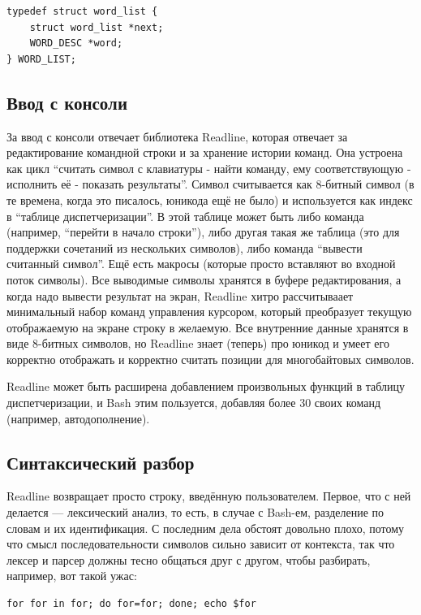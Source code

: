 \documentclass[a5paper]{article}
\begin{document}
\begin{verbatim}
typedef struct word_list {
    struct word_list *next;
    WORD_DESC *word;
} WORD_LIST;
\end{verbatim}

\subsection{Ввод с консоли}

За ввод с консоли отвечает библиотека Readline, которая отвечает за редактирование командной строки и за хранение истории команд. Она устроена как цикл ``считать символ с клавиатуры - найти команду, ему соответствующую - исполнить её - показать результаты''. Символ считывается как 8-битный символ (в те времена, когда это писалось, юникода ещё не было) и используется как индекс в ``таблице диспетчеризации''. В этой таблице может быть либо команда (например, ``перейти в начало строки''), либо другая такая же таблица (это для поддержки сочетаний из нескольких символов), либо команда ``вывести считанный символ''. Ещё есть макросы (которые просто вставляют во входной поток символы). Все выводимые символы хранятся в буфере редактирования, а когда надо вывести результат на экран, Readline хитро рассчитываает минимальный набор команд управления курсором, который преобразует текущую отображаемую на экране строку в желаемую. Все внутренние данные хранятся в виде 8-битных символов, но Readline знает (теперь) про юникод и умеет его корректно отображать и корректно считать позиции для многобайтовых символов.

Readline может быть расширена добавлением произвольных функций в таблицу диспетчеризации, и Bash этим пользуется, добавляя более 30 своих команд (например, автодополнение).

\subsection{Синтаксический разбор}

Readline возвращает просто строку, введённую пользователем. Первое, что с ней делается --- лексический анализ, то есть, в случае с Bash-ем, разделение по словам и их идентификация. С последним дела обстоят довольно плохо, потому что смысл последовательности символов сильно зависит от контекста, так что лексер и парсер должны тесно общаться друг с другом, чтобы разбирать, например, вот такой ужас:

\begin{verbatim}
for for in for; do for=for; done; echo $for
\end{verbatim}
\end{document}
